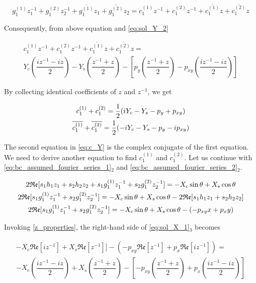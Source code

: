 \documentclass{article}
\begin{document}
\begin{equation*}
    g_1^{(1)} z_1^{-1} + g_1^{(2)} z_2^{-1} + \overline{g_1^{(1)}} z_1 + \overline{g_1^{(2)}} z_2 = c_1^{(1)} z^{-1} + c_1^{(2)} z^{-1} + \overline{c_1^{(1)}} z + \overline{c_1^{(2)}} z
\end{equation*}

Consequently, from above equation and \cref{eq:sol_Y_2}

\begin{multline*}
    c_1^{(1)} z^{-1} + c_1^{(2)} z^{-1} + \overline{c_1^{(1)}} z + \overline{c_1^{(2)}} z = \\
    Y_c \left(\dfrac{iz^{-1} - iz}{2}\right) - Y_s \left(\dfrac{z^{-1} + z}{2}\right) - \left[ p_y \left(\dfrac{z^{-1} + z}{2}\right) - p_{xy} \left(\dfrac{iz^{-1} - iz}{2}\right) \right]
\end{multline*}

By collecting identical coefficients of $z$ and $z^{-1}$, we get

\begin{gather}
    c_1^{(1)} + c_1^{(2)} = \dfrac{1}{2} (i Y_c - Y_s - p_y + p_{xy}) \notag \\
    \overline{c_1^{(1)}} + \overline{c_1^{(2)}} = \dfrac{1}{2} (-i Y_c - Y_s - p_y - i p_{xy}) 
    \label{eq:c_Y}
\end{gather}

The second equation in \cref{eq:c_Y} is the complex conjugate of the first equation. We need to derive another equation to find $c_1^{(1)}$ and  $c_1^{(2)}$. Let us continue with \cref{eq:bc_assumed_fourier_series_1}$_2$ and \cref{eq:bc_assumed_fourier_series_2}$_2$. 

\begin{gather}
    2 \mathfrak{Re}[s_1 h_1 z_1 + s_2 h_2 z_2 + s_1 g_1^{(1)} z_1^{-1} + s_2 g_1^{(2)} z_2^{-1}] = -X_c \sin\theta + X_s \cos\theta \notag\\
    2 \mathfrak{Re}[s_1 g_1^{(1)} z_1^{-1} + s_2 g_1^{(2)} z_2^{-1}] = -X_c \sin\theta + X_s \cos\theta - 2 \mathfrak{Re}[s_1 h_1 z_1 + s_2 h_2 z_2] \notag\\
    2 \mathfrak{Re}[s_1 g_1^{(1)} z_1^{-1} + s_2 g_1^{(2)} z_2^{-1}] = -X_c \sin\theta + X_s \cos\theta - (-p_{xy} x + p_x y)
    \label{eq:sol_X_1}
\end{gather}

Invoking \cref{z_properties}, the right-hand side of \cref{eq:sol_X_1}$_3$ becomes

\begin{multline}
    -X_c \mathfrak{Re}[iz^{-1}] + X_s \mathfrak{Re}[z^{-1}]] - (-p_{xy} \mathfrak{Re}[z^{-1}] + p_x \mathfrak{Re}[iz^{-1}]) = \\
    -X_c \left(\dfrac{iz^{-1} - iz}{2}\right) + X_s \left(\dfrac{z^{-1} + z}{2}\right) - \left[ -p_{xy} \left(\dfrac{z^{-1} + z}{2}\right) + p_x \left(\dfrac{iz^{-1} - iz}{2}\right) \right]
    \label{eq:sol_X_2}
\end{multline}
\end{document}
